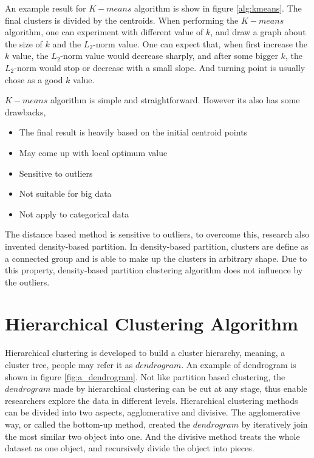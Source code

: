\documentclass[utf8,english]{gradu3}
\begin{document}
An example result for $K-means$ algorithm is show in figure \ref{alg:kmeans}. The final clusters is divided by the centroids.
When performing the $K-means$ algorithm, one can experiment with different value of $k$, and draw a graph about the size of $k$ and the $L_2$-norm value. One can expect that, when first increase the $k$ value, the $L_2$-norm value would decrease sharply, and after some bigger $k$, the $L_2$-norm would stop or decrease with a small slope. And turning point is usually chose as a good $k$ value.

$K-means$ algorithm is simple and straightforward. However its also has some drawbacks,

\begin{itemize}
	\item The final result is heavily based on the initial centroid points
	\item May come up with local optimum value
	\item Sensitive to outliers
	\item Not suitable for big data
	\item Not apply to categorical data
\end{itemize}

The distance based method is sensitive to outliers, to overcome this, research also invented density-based partition. In density-based partition, clusters are define as a connected group and is able to make up the clusters in arbitrary shape. Due to this property, density-based partition clustering algorithm does not influence by the outliers.


\section{Hierarchical Clustering Algorithm}

Hierarchical clustering is developed to build a cluster hierarchy, meaning, a cluster tree, people may refer it as $dendrogram$. An example of dendrogram is shown in figure \ref{fig:a_dendrogram}. Not like partition based clustering, the $dendrogram$ made by hierarchical clustering can be cut at any stage, thus enable researchers explore the data in different levels. Hierarchical clustering methods can be divided into two aspects, agglomerative and divisive. The agglomerative way, or called the bottom-up method, created the $dendrogram$ by iteratively join the most similar two object into one. And the divisive method treats the whole dataset as one object, and recursively divide the object into pieces.
\end{document}
